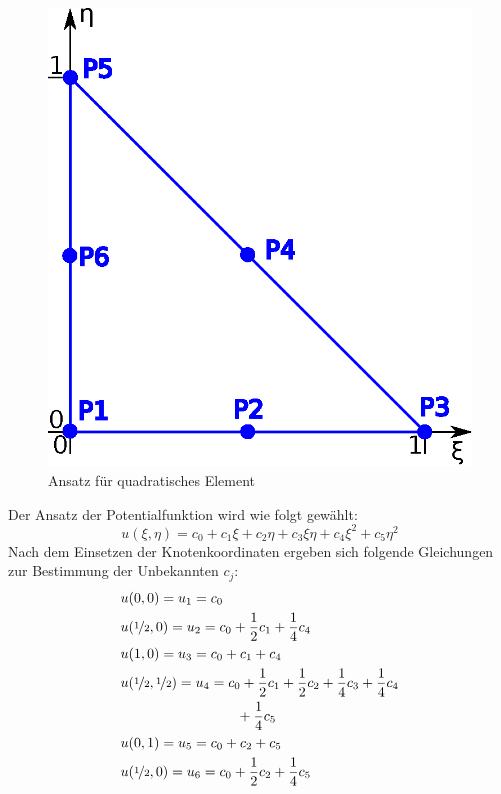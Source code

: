 \begin{figure}
	\begin{center}
		\includegraphics[scale=0.65]{pics/quadratic_element.eps}
	\end{center}
	\caption{Ansatz für quadratisches Element}
	\label{fig:quadratic_element}
\end{figure}

Der Ansatz der Potentialfunktion wird wie folgt gewählt:
\begin{equation}
\label{eq:quadratic_triangle_eq}
u(\xi, \eta) = c_0 + c_1 \xi + c_2 \eta + c_3 \xi \eta + c_4 \xi^2 + c_5 \eta^2
\end{equation}	
Nach dem Einsetzen der Knotenkoordinaten ergeben sich folgende Gleichungen zur Bestimmung der Unbekannten $c_j$:
\begin{align}
&u(0,0) = u_1 = c_0\\
&u(\nicefrac{1}{2}, 0) = u_2 = c_0 + \frac{1}{2} c_1 + \frac{1}{4} c_4 \nonumber \\
&u(1, 0) = u_3 = c_0 + c_1 + c_4 \nonumber \\
&u(\nicefrac{1}{2}, \nicefrac{1}{2}) = u_4 = c_0 + \frac{1}{2} c_1 + \frac{1}{2} c_2 + \frac{1}{4} c_3 + \frac{1}{4} c_4  \nonumber \\ 
&\quad \quad \quad \quad \quad \quad \quad \quad \ +\frac{1}{4} c_5\nonumber \\
&u(0, 1) = u_5 = c_0 + c_2 + c_5 \nonumber \\
&u(\nicefrac{1}{2}, 0) = u_6 = c_0 + \frac{1}{2} c_2 + \frac{1}{4} c_5 \nonumber
\end{align}		

